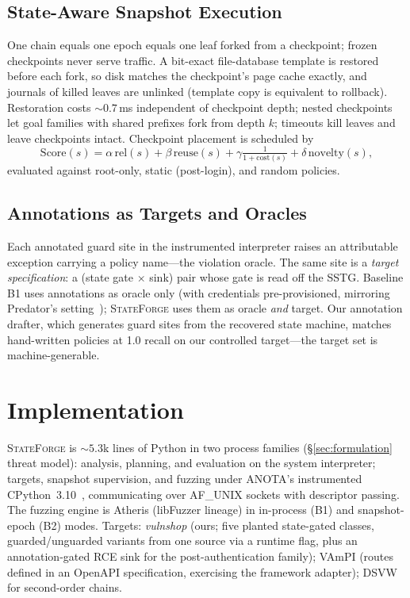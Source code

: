 \documentclass[letterpaper,twocolumn,10pt]{article}
\newcommand{\sys}{\textsc{StateForge}}
\begin{document}
\subsection{State-Aware Snapshot Execution}
\label{sec:snapshot}
One chain equals one epoch equals one leaf forked from a checkpoint; frozen checkpoints never serve traffic. A bit-exact file-database template is restored before each fork, so disk matches the checkpoint's page cache exactly, and journals of killed leaves are unlinked (template copy is equivalent to rollback). Restoration costs ${\sim}0.7$\,ms independent of checkpoint depth; nested checkpoints let goal families with shared prefixes fork from depth $k$; timeouts kill leaves and leave checkpoints intact. Checkpoint placement is scheduled by
\begin{equation}
\mathrm{Score}(s) = \alpha\,\mathrm{rel}(s) + \beta\,\mathrm{reuse}(s) + \gamma\tfrac{1}{1+\mathrm{cost}(s)} + \delta\,\mathrm{novelty}(s),
\end{equation}
evaluated against root-only, static (post-login), and random policies.

\subsection{Annotations as Targets and Oracles}
\label{sec:annotations}
Each annotated guard site in the instrumented interpreter raises an attributable exception carrying a policy name---the violation oracle. The same site is a \emph{target specification}: a (state gate $\times$ sink) pair whose gate is read off the SSTG. Baseline B1 uses annotations as oracle only (with credentials pre-provisioned, mirroring Predator's setting~\cite{predator}); \sys{} uses them as oracle \emph{and} target. Our annotation drafter, which generates guard sites from the recovered state machine, matches hand-written policies at 1.0 recall on our controlled target---the target set is machine-generable.

\section{Implementation}
\label{sec:impl}
\sys{} is ${\sim}5.3$k lines of Python in two process families (\S\ref{sec:formulation} threat model): analysis, planning, and evaluation on the system interpreter; targets, snapshot supervision, and fuzzing under ANOTA's instrumented CPython~3.10~\cite{anota}, communicating over AF\_UNIX sockets with descriptor passing. The fuzzing engine is Atheris (libFuzzer lineage) in in-process (B1) and snapshot-epoch (B2) modes. Targets: \emph{vulnshop} (ours; five planted state-gated classes, guarded/unguarded variants from one source via a runtime flag, plus an annotation-gated RCE sink for the post-authentication family); VAmPI (routes defined in an OpenAPI specification, exercising the framework adapter); DSVW for second-order chains.
\end{document}
